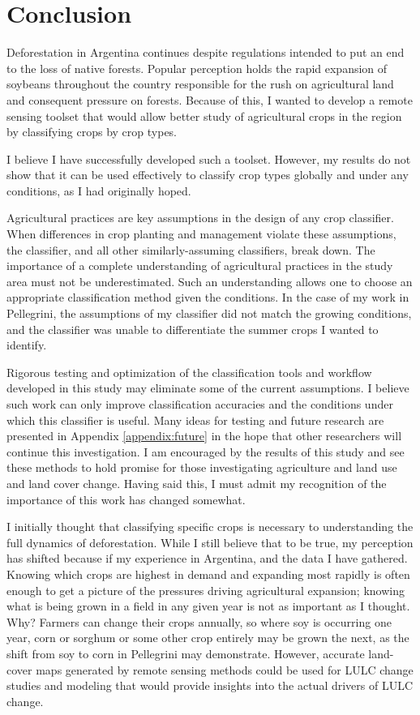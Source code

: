 \chapter{Conclusion}

Deforestation in Argentina continues despite regulations intended to put an end to the loss of native forests. Popular perception holds the rapid expansion of soybeans throughout the country responsible for the rush on agricultural land and consequent pressure on forests. Because of this, I wanted to develop a remote sensing toolset that would allow better study of agricultural crops in the region by classifying crops by crop types.

I believe I have successfully developed such a toolset. However, my results do not show that it can be used effectively to classify crop types globally and under any conditions, as I had originally hoped.

Agricultural practices are key assumptions in the design of any crop classifier. When differences in crop planting and management violate these assumptions, the classifier, and all other similarly-assuming classifiers, break down. The importance of a complete understanding of agricultural practices in the study area must not be underestimated. Such an understanding allows one to choose an appropriate classification method given the conditions. In the case of my work in Pellegrini, the assumptions of my classifier did not match the growing conditions, and the classifier was unable to differentiate the summer crops I wanted to identify.

Rigorous testing and optimization of the classification tools and workflow developed in this study may eliminate some of the current assumptions. I believe such work can only improve classification accuracies and the conditions under which this classifier is useful.  Many ideas for testing and future research are presented in Appendix \ref{appendix:future} in the hope that other researchers will continue this investigation. I am encouraged by the results of this study and see these methods to hold promise for those investigating agriculture and land use and land cover change. Having said this, I must admit my recognition of the importance of this work has changed somewhat.

I initially thought that classifying specific crops is necessary to understanding the full dynamics of deforestation. While I still believe that to be true, my perception has shifted because if my experience in Argentina, and the data I have gathered. Knowing which crops are highest in demand and expanding most rapidly is often enough to get a picture of the pressures driving agricultural expansion; knowing what is being grown in a field in any given year is not as important as I thought. Why? Farmers can change their crops annually, so where soy is occurring one year, corn or sorghum or some other crop entirely may be grown the next, as the shift from soy to corn in Pellegrini may demonstrate. However, accurate land-cover maps generated by remote sensing methods could be used for LULC change studies and modeling that would provide insights into the actual drivers of LULC change.

